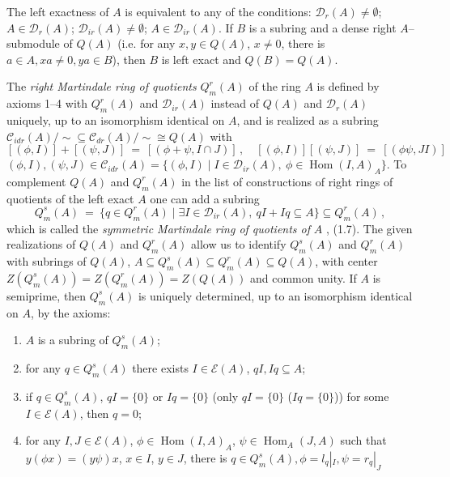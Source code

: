 \documentclass[a4paper,11pt]{article}
\DeclareMathOperator{\Hom}{Hom}
\begin{document}
The left exactness of $A$ is equivalent to any of the conditions: 
${\mathcal{D}_r(A)\ne \emptyset}$; 
${A\in \mathcal{D}_r(A)}$; ${\mathcal{D}_{ir}(A)\ne \emptyset}$; 
${A\in \mathcal{D}_{ir}(A)}$. 
If $B$ is a subring and a dense right $A$--submodule of $Q(A)$ (i.e. for any 
${x, y\in Q(A)}$, ${x\ne 0}$, there is ${a\in A, x a\ne 0, y a\in B}$), then 
$B$ is left exact and ${Q(B)=Q(A)}$.

The \emph{right Martindale ring of quotients} $Q^r_m(A)$ of the ring $A$ is 
defined by axioms 1--4 with $Q^r_m(A)$ and $\mathcal{D}_{ir}(A)$ instead 
of $Q(A)$ and $\mathcal{D}_r(A)$ uniquely, up to an isomorphism identical 
on $A$, and is realized as a subring 
${\mathcal{C}_{idr}(A)/\sim\subseteq \mathcal{C}_{dr}(A)/\sim\cong Q(A)}$ with 
\[
[(\phi, I)]+[(\psi, J)]\ =\ [(\phi+\psi, I\cap J)]\,,\quad 
[(\phi, I)] [(\psi, J)]\ =\ [(\phi \psi, J I)]
\]
${(\phi, I), (\psi, J)\in \mathcal{C}_{idr}(A)=\{(\phi, I)\mid 
I\in \mathcal{D}_{ir}(A),\ \phi\in \Hom(I, A)_A\}}$. To complement $Q(A)$ and 
$Q^r_m(A)$ in the list of constructions of right rings of quotients of the 
left exact $A$ one can add a subring 
\[
Q^s_m(A)\ =\ \{q\in Q^r_m(A)\mid \exists I\in \mathcal{D}_{ir}(A),\ 
q I+I q\subseteq A\}\subseteq Q^r_m(A)\,,
\]
which is called the \emph{symmetric Martindale ring of quotients of} $A$
\cite{Ut}, (1.7). The given realizations of $Q(A)$ and $Q^r_m(A)$ allow 
us to identify $Q^s_m(A)$ and $Q^r_m(A)$ with subrings of $Q(A)$, 
${A\subseteq Q^s_m(A)\subseteq Q^r_m(A)\subseteq Q(A)}$, with center 
${Z(Q^s_m(A))=Z(Q^r_m(A))=Z(Q(A))}$ and common unity. If $A$ is semiprime, 
then $Q^s_m(A)$ is uniquely determined, up to an isomorphism identical on $A$, 
by the axioms: 
\begin{enumerate}

\item $A$ is a subring of $Q^s_m(A)$; 

\item for any ${q\in Q^s_m(A)}$ there exists ${I\in \mathcal{E}(A)}$, 
${q I, I q\subseteq A}$; 

\item if ${q\in Q^s_m(A)}$, ${q I=\{0\}}$ or ${I q=\{0\}}$ (only  
${q I=\{0\}}$ (${I q=\{0\}}$)) for some ${I\in \mathcal{E}(A)}$, 
then ${q=0}$; 

\item for any ${I, J\in \mathcal{E}(A)}$, ${\phi\in \Hom(I, A)_A}$, 
${\psi\in \Hom_A(J, A)}$ such that ${y (\phi x)=(y \psi) x}$, ${x\in I}$, 
${y\in J}$, there is ${q\in Q^s_m(A), \phi=l_q|_I, \psi=r_q|_J}$

\end{enumerate}
\end{document}
